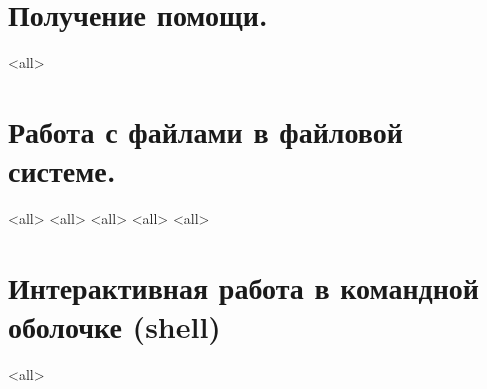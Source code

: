 \section{Получение помощи.}
\mode<all>{}

\section{Работа с файлами в файловой системе.}
\mode<all>{}
\mode<all>{}
\mode<all>{}
\mode<all>{}
\mode<all>{}
\section{Интерактивная работа в командной оболочке (shell)}
\mode<all>{}

\bye
